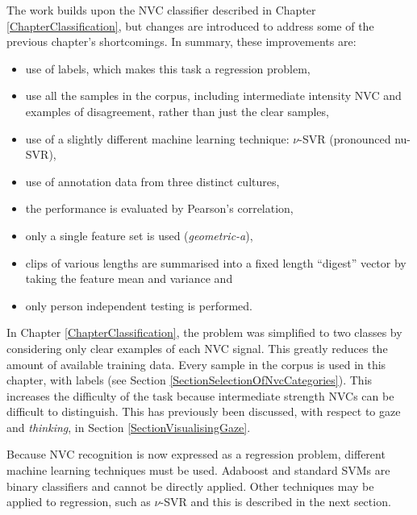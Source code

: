 The work builds upon the \ac{NVC} classifier described in Chapter \ref{ChapterClassification}, but changes are introduced to address some of the previous chapter's shortcomings. In summary, these improvements are:

\begin{itemize}
 \item use of \continuous labels, which makes this task a regression problem,
 \item use all the samples in the corpus, including intermediate intensity \ac{NVC} and examples of disagreement, rather than just the clear samples,
 \item use of a slightly different machine learning technique: $\nu$-SVR (pronounced nu-SVR),
 \item use of annotation data from three distinct cultures,
 \item the performance is evaluated by Pearson's correlation,
 \item only a single feature set is used (\textit{geometric-a}), 
 \item clips of various lengths are summarised into a fixed length ``digest'' vector by taking the feature mean and variance and
 \item only person independent testing is performed.
\end{itemize}


In Chapter \ref{ChapterClassification}, the problem was simplified to two classes by considering only clear examples of each \ac{NVC} signal. This greatly reduces the amount of available training data. Every sample in the corpus is used in this chapter, with \continuous labels (see Section \ref{SectionSelectionOfNvcCategories}). This increases the difficulty of the task because intermediate strength \ac{NVC}s can be difficult to distinguish. This has previously been discussed, with respect to gaze and \textit{thinking}, in Section \ref{SectionVisualisingGaze}.

Because \ac{NVC} recognition is now expressed as a regression problem, different machine learning techniques must be used. Adaboost and standard \ac{SVM}s are binary classifiers and cannot be directly applied. Other techniques may be applied to regression, such as $\nu$-SVR \cite{Scholkopf2000} and this is described in the next section.

